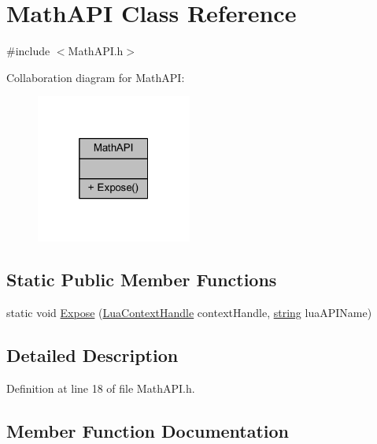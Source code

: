 \hypertarget{class_math_a_p_i}{}\section{Math\+A\+PI Class Reference}
\label{class_math_a_p_i}


{\ttfamily \#include $<$Math\+A\+P\+I.\+h$>$}



Collaboration diagram for Math\+A\+PI\+:\nopagebreak
\begin{figure}[H]
\begin{center}
\leavevmode
\includegraphics[width=145pt]{class_math_a_p_i__coll__graph}
\end{center}
\end{figure}
\subsection*{Static Public Member Functions}
\begin{DoxyCompactItemize}
\item 
static void \hyperlink{class_math_a_p_i_ab935c484c71c9f1b8e1ced06bb32823d}{Expose} (\hyperlink{_lua_context_8h_a2ffcc2d3ed21165072a1d7b61259bf14}{Lua\+Context\+Handle} context\+Handle, \hyperlink{_types_8h_ad453f9f71ce1f9153fb748d6bb25e454}{string} lua\+A\+P\+I\+Name)
\end{DoxyCompactItemize}


\subsection{Detailed Description}


Definition at line 18 of file Math\+A\+P\+I.\+h.



\subsection{Member Function Documentation}
